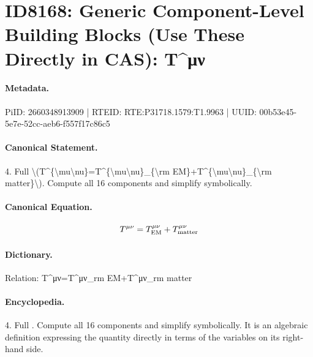 \section*{ID8168: Generic Component-Level Building Blocks (Use These Directly in CAS): T\textasciicircum{}μν}
\paragraph{Metadata.}
PiID: 2660348913909 | RTEID: RTE:P31718.1579:T1.9963 | UUID: 00b53e45-5e7e-52cc-aeb6-f557f17c86c5

\paragraph{Canonical Statement.}
4. Full \textbackslash{}(T\textasciicircum{}\{\textbackslash{}mu\textbackslash{}nu\}=T\textasciicircum{}\{\textbackslash{}mu\textbackslash{}nu\}\_\{\textbackslash{}rm EM\}+T\textasciicircum{}\{\textbackslash{}mu\textbackslash{}nu\}\_\{\textbackslash{}rm matter\}\textbackslash{}). Compute all 16 components and simplify symbolically.

\paragraph{Canonical Equation.}
\[
T^{\mu\nu}=T^{\mu\nu}_{\rm EM}+T^{\mu\nu}_{\rm matter}
\]

\paragraph{Dictionary.}
Relation: T\textasciicircum{}μν=T\textasciicircum{}μν\_rm EM+T\textasciicircum{}μν\_rm matter

\paragraph{Encyclopedia.}
4. Full . Compute all 16 components and simplify symbolically. It is an algebraic definition expressing the quantity directly in terms of the variables on its right-hand side.
